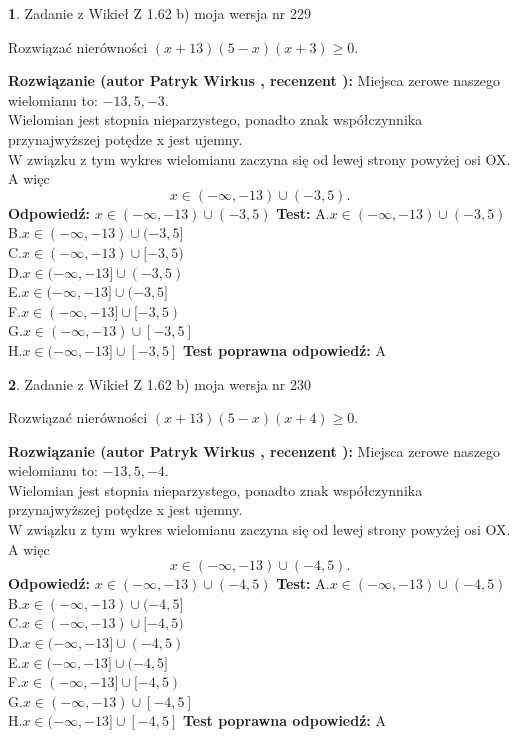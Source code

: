 \documentclass[12pt, a4paper]{article}
\theoremstyle{definition} %
\newtheorem{zad}{}
\newcommand{\zadStart}[1]{\begin{zad}#1\newline}
\newcommand{\zadStop}{\end{zad}}
\newcommand{\rozwStart}[2]{\noindent \textbf{Rozwiązanie (autor #1 , recenzent #2): }\newline}
\newcommand{\rozwStop}{\newline}
\newcommand{\odpStart}{\noindent \textbf{Odpowiedź:}\newline}
\newcommand{\odpStop}{\newline}
\newcommand{\testStart}{\noindent \textbf{Test:}\newline}
\newcommand{\testStop}{\newline}
\newcommand{\kluczStart}{\noindent \textbf{Test poprawna odpowiedź:}\newline}
\newcommand{\kluczStop}{\newline}
\begin{document}
\zadStart{Zadanie z Wikieł Z 1.62 b) moja wersja nr 229}

Rozwiązać nierówności $(x+13)(5-x)(x+3)\ge0$.
\zadStop
\rozwStart{Patryk Wirkus}{}
Miejsca zerowe naszego wielomianu to: $-13, 5, -3$.\\
Wielomian jest stopnia nieparzystego, ponadto znak współczynnika przy\linebreak najwyższej potędze x jest ujemny.\\ W związku z tym wykres wielomianu zaczyna się od lewej strony powyżej osi OX. A więc $$x \in (-\infty,-13) \cup (-3,5).$$
\rozwStop
\odpStart
$x \in (-\infty,-13) \cup (-3,5)$
\odpStop
\testStart
A.$x \in (-\infty,-13) \cup (-3,5)$\\
B.$x \in (-\infty,-13) \cup (-3,5]$\\
C.$x \in (-\infty,-13) \cup [-3,5)$\\
D.$x \in (-\infty,-13] \cup (-3,5)$\\
E.$x \in (-\infty,-13] \cup (-3,5]$\\
F.$x \in (-\infty,-13] \cup [-3,5)$\\
G.$x \in (-\infty,-13) \cup [-3,5]$\\
H.$x \in (-\infty,-13] \cup [-3,5]$
\testStop
\kluczStart
A
\kluczStop



\zadStart{Zadanie z Wikieł Z 1.62 b) moja wersja nr 230}

Rozwiązać nierówności $(x+13)(5-x)(x+4)\ge0$.
\zadStop
\rozwStart{Patryk Wirkus}{}
Miejsca zerowe naszego wielomianu to: $-13, 5, -4$.\\
Wielomian jest stopnia nieparzystego, ponadto znak współczynnika przy\linebreak najwyższej potędze x jest ujemny.\\ W związku z tym wykres wielomianu zaczyna się od lewej strony powyżej osi OX. A więc $$x \in (-\infty,-13) \cup (-4,5).$$
\rozwStop
\odpStart
$x \in (-\infty,-13) \cup (-4,5)$
\odpStop
\testStart
A.$x \in (-\infty,-13) \cup (-4,5)$\\
B.$x \in (-\infty,-13) \cup (-4,5]$\\
C.$x \in (-\infty,-13) \cup [-4,5)$\\
D.$x \in (-\infty,-13] \cup (-4,5)$\\
E.$x \in (-\infty,-13] \cup (-4,5]$\\
F.$x \in (-\infty,-13] \cup [-4,5)$\\
G.$x \in (-\infty,-13) \cup [-4,5]$\\
H.$x \in (-\infty,-13] \cup [-4,5]$
\testStop
\kluczStart
A
\kluczStop
\end{document}
